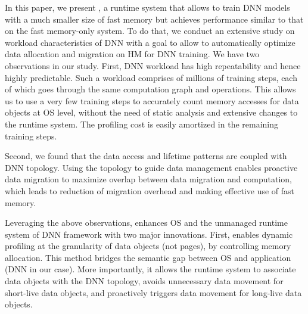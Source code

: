 In this paper, we present \textit{\name}, %
\textcolor{dong2}{a runtime system that allows to train DNN models with a much smaller size of fast memory but achieves performance similar to that on the fast memory-only system. To do that, we conduct an extensive study on workload characteristics of DNN with a goal to allow \name to automatically optimize data allocation and migration on HM for DNN training. We have two observations in our study. }
First, DNN workload has high repeatability and hence highly predictable. Such a workload comprises of millions of training steps, each of which goes through the \textcolor{check}{same computation graph and operations.} This allows us to use a very few training steps to accurately count memory accesses for data objects at OS level, without the need of static analysis and extensive changes to the runtime system. The profiling cost is easily amortized in the remaining training steps.

Second, we found that the data access and lifetime patterns are coupled with DNN topology.  
Using the topology to guide data management enables proactive data migration to maximize overlap between data migration and computation, which leads to  reduction of migration overhead and making effective use of fast memory. 

Leveraging the above observations, \name enhances OS and the \textcolor{dong}{unmanaged} runtime system of DNN framework with two major innovations. First, \name enables dynamic profiling at the granularity of data objects (not pages), by controlling memory allocation.  This method bridges the semantic gap between OS and application (DNN in our case). More importantly, it allows the runtime system to associate data objects with the DNN topology, 
\textcolor{check}{avoids unnecessary data movement for short-live data objects, and proactively triggers data movement for long-live data objects.
} 

